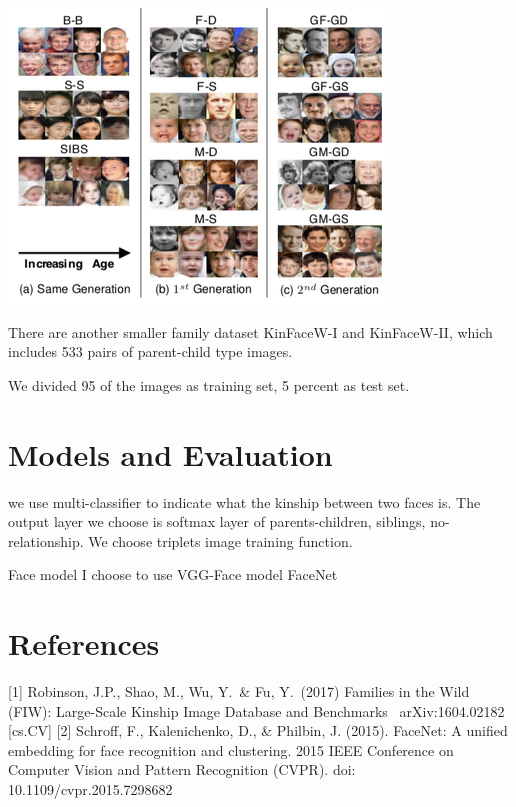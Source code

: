 \documentclass{article}
\begin{document}
\includegraphics{facepairs}

There are another smaller family dataset KinFaceW-I and KinFaceW-II, which
includes 533 pairs of parent-child type images.

We divided 95 of the images as training set, 5 percent as test set.

\section{Models and Evaluation}
we use multi-classifier to indicate what the kinship between two faces is. The
output layer we choose is softmax layer of {parents-children, siblings, no-relationship}.  We
choose triplets image training function.

Face model I choose to use VGG-Face model FaceNet

\section*{References}
\medskip
\small
[1] Robinson, J.P., Shao, M., Wu, Y.\ \& Fu, Y.\ (2017) Families in the Wild (FIW): Large-Scale Kinship Image Database and Benchmarks \ arXiv:1604.02182 [cs.CV]
[2] Schroff, F., Kalenichenko, D., & Philbin, J. (2015). FaceNet: A unified embedding for face recognition and clustering. 2015 IEEE Conference on Computer Vision and Pattern Recognition (CVPR). doi: 10.1109/cvpr.2015.7298682
\end{document}
